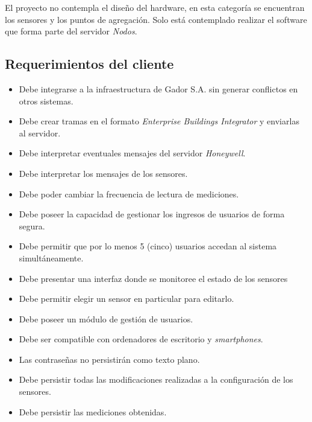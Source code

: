		El proyecto no contempla el diseño del hardware, en esta categoría se encuentran los sensores y los puntos de agregación. Solo está contemplado realizar el software que forma parte del servidor \emph{Nodos}.
	
	\subsection{Requerimientos del cliente}
	\label{requerimientos}
		\begin{itemize}
			\item Debe integrarse a la infraestructura de Gador S.A. sin generar conflictos en otros sistemas.
			\item Debe crear tramas en el formato \emph{Enterprise Buildings Integrator} y enviarlas al servidor.
			\item Debe interpretar eventuales mensajes del servidor \emph{Honeywell}.
			\item Debe interpretar los mensajes de los sensores.
			\item Debe poder cambiar la frecuencia de lectura de mediciones.
			\item Debe poseer la capacidad de gestionar los ingresos de usuarios de forma segura.
			\item Debe permitir que por lo menos 5 (cinco) usuarios accedan al sistema simultáneamente.
			\item Debe presentar una interfaz donde se monitoree el estado de los sensores
			\item Debe permitir elegir un sensor en particular para editarlo.
			\item Debe poseer un módulo de gestión de usuarios.
			\item Debe ser compatible con ordenadores de escritorio y \emph{smartphones}.
			\item Las contraseñas no persistirán como texto plano.
			\item Debe persistir todas las modificaciones realizadas a la configuración de los sensores.
			\item Debe persistir las mediciones obtenidas.
		\end{itemize}